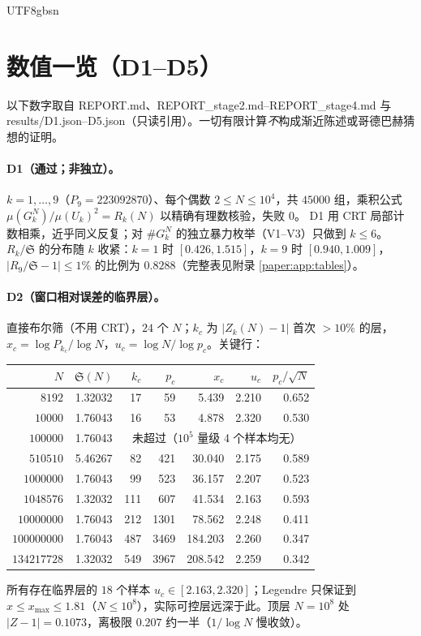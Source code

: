 \documentclass[11pt,a4paper]{article}
\newcommand{\Haar}{\mu}
\newcommand{\Sing}{\mathfrak S}
\theoremstyle{plain}
\theoremstyle{definition}
\begin{document}
\begin{CJK}{UTF8}{gbsn}
\section{数值一览（D1--D5）}\label{paper:sec:numerics}

以下数字取自 REPORT.md、REPORT\_stage2.md--REPORT\_stage4.md 与 results/D1.json--D5.json（只读引用）。一切有限计算\emph{不}构成渐近陈述或哥德巴赫猜想的证明。

\paragraph{D1（通过；非独立）。} $k=1,\dots,9$（$P_9=223092870$）、每个偶数 $2\le N\le10^4$，共 $45000$ 组，乘积公式 $\Haar(G_k^N)/\Haar(U_k)^2=R_k(N)$ 以精确有理数核验，失败 $0$。
D1 用 CRT 局部计数相乘，近乎同义反复；对 $\#G_k^N$ 的独立暴力枚举（V1--V3）只做到 $k\le6$。$R_k/\Sing$ 的分布随 $k$ 收紧：$k=1$ 时 $[0.426,1.515]$，$k=9$ 时 $[0.940,1.009]$，
$|R_9/\Sing-1|\le1\%$ 的比例为 $0.8288$（完整表见附录 \ref{paper:app:tables}）。

\paragraph{D2（窗口相对误差的临界层）。} 直接布尔筛（不用 CRT），$24$ 个 $N$；$k_c$ 为 $|Z_k(N)-1|$ 首次 $>10\%$ 的层，$x_c=\log P_{k_c}/\log N$，$u_c=\log N/\log p_c$。关键行：
\begin{center}
\small
\begin{tabular}{rcrrrrr}
\hline
$N$ & $\Sing(N)$ & $k_c$ & $p_c$ & $x_c$ & $u_c$ & $p_c/\sqrt N$\\
\hline
$8192$ & 1.32032 & 17 & 59 & 5.439 & 2.210 & 0.652\\
$10000$ & 1.76043 & 16 & 53 & 4.878 & 2.320 & 0.530\\
$100000$ & 1.76043 & \multicolumn{5}{c}{未超过（$10^5$ 量级 4 个样本均无）}\\
$510510$ & 5.46267 & 82 & 421 & 30.040 & 2.175 & 0.589\\
$1000000$ & 1.76043 & 99 & 523 & 36.157 & 2.207 & 0.523\\
$1048576$ & 1.32032 & 111 & 607 & 41.534 & 2.163 & 0.593\\
$10000000$ & 1.76043 & 212 & 1301 & 78.562 & 2.248 & 0.411\\
$100000000$ & 1.76043 & 487 & 3469 & 184.203 & 2.260 & 0.347\\
$134217728$ & 1.32032 & 549 & 3967 & 208.542 & 2.259 & 0.342\\
\hline
\end{tabular}
\end{center}
所有存在临界层的 $18$ 个样本 $u_c\in[2.163,2.320]$；Legendre 只保证到 $x\le x_{\max}\le1.81$（$N\le10^8$），实际可控层远深于此。顶层 $N=10^8$ 处 $|Z-1|=0.1073$，离极限 $0.207$ 约一半（$1/\log N$ 慢收敛）。


\end{CJK}
\end{document}
